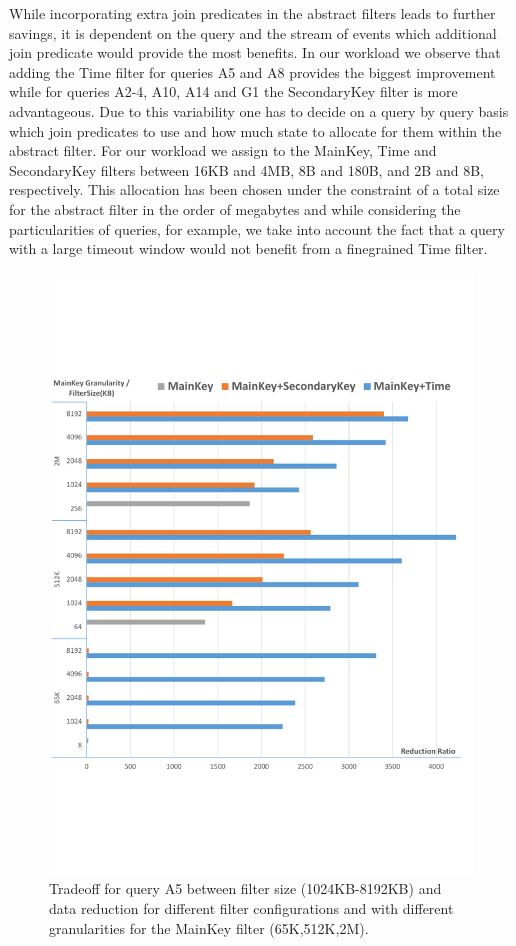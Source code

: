 While incorporating extra join predicates in the abstract filters leads to
further savings, it is dependent on the query and the stream of events which
additional join predicate would provide the most benefits.
In our workload we observe that adding the Time filter for queries A5 and A8 
provides the biggest improvement while for queries A2-4, A10, A14 and G1 the
SecondaryKey filter is more advantageous. 
Due to this variability one has to decide on a query by query basis which join
predicates to use and how much state to allocate for them within the abstract
filter.
For our workload we assign to the MainKey, Time and SecondaryKey filters between
16KB and 4MB, 8B and 180B, and 2B and 8B, respectively.
This allocation has been chosen under the constraint of a total size for the
abstract filter in the order of megabytes and while considering the
particularities of queries, for example, we take into account the fact that a
query with a large timeout window would not benefit from a finegrained Time
filter.






\begin{figure}[tp]
\centering

\includegraphics[clip, trim=0cm 3.8cm 0.3cm 3.2cm,
width=\columnwidth]{graphs/A5_tradeoff.pdf}
\caption{Tradeoff for query A5 between filter size (1024KB-8192KB) and data
reduction for different filter configurations and with different granularities
for the MainKey filter (65K,512K,2M).}
\label{fig:tradeoff}
\end{figure}




